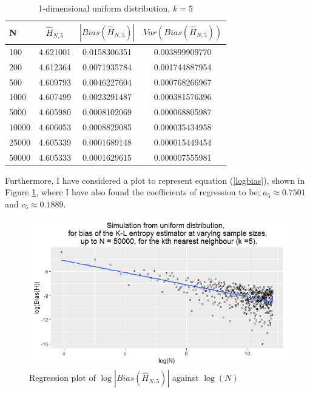 \documentclass{report}
\begin{document}
\begin{table}
\caption{1-dimensional uniform distribution, $k=5$} \label{uniform_k=5_table}
\begin{center}
\begin{tabular}{| l | c c c|} 
\toprule
N & $\hat{H}_{N, 5}$ & $|Bias(\hat{H}_{N, 5})|$ & $Var(Bias(\hat{H}_{N, 5}))$ \\
\midrule[1pt]
100     & 4.621001     & 0.0158306351     & 0.003899909770  \\
200     & 4.612364     & 0.0071935784     & 0.001744887954  \\
500     & 4.609793     & 0.0046227604     & 0.000768266967  \\
1000    & 4.607499     & 0.0023291487     & 0.000381576396  \\
5000    & 4.605980     & 0.0008102069     & 0.000068805987  \\
10000   & 4.606053     & 0.0008829085     & 0.000035434958  \\
25000   & 4.605339     & 0.0001689148     & 0.000015449454  \\
50000   & 4.605333     & 0.0001629615     & 0.000007555981  \\
\hline
\end{tabular}
\end{center}
\end{table}

Furthermore, I have considered a plot to represent equation (\ref{logbias}), shown in Figure \ref{uniform_k=5_graph}, where I have also found the coefficients of regression to be; $a_{5} \approx 0.7501$ and $c_{5} \approx 0.1889$. 

\begin{figure}
  \begin{center}
    \includegraphics[width=\textwidth]{./Graphs/Uniform_k=5_plot.png}
  \end{center}
\caption{Regression plot of $\log|Bias(\hat{H}_{N, 5})|$ against $\log(N)$}
  \label{uniform_k=5_graph}
\end{figure}
\end{document}
